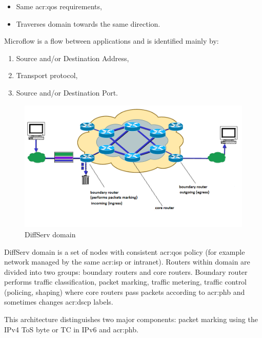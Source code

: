 \documentclass[11pt]{book}
\begin{document}
        \begin{itemize}
          \item Same \gls{acr:qos} requirements,
          \item Traverses domain towards the same direction.
        \end{itemize}

        Microflow is a flow between applications and is identified mainly by:

        \begin{enumerate}
          \item Source and/or Destination Address,
          \item Transport protocol,
          \item Source and/or Destination Port.
        \end{enumerate}

        \begin{figure}[H]
          \begin{center}
            \includegraphics[width=.7\textwidth]{img/qos/diffserv.png}
          \end{center}
          \caption{DiffServ domain}
        \end{figure} %

        DiffServ domain is a set of nodes with consistent \gls{acr:qos} policy (for example network managed by the same
        \gls{acr:isp} or intranet). Routers within domain are divided into two groups: boundary routers and core
        routers. Boundary router performs traffic classification, packet marking, traffic metering, traffic control
        (policing, shaping) where core routers pass packets according to \gls{acr:phb} and sometimes changes
        \gls{acr:dscp} labels.

        This architecture distinguishes two major components: packet marking using the IPv4 ToS byte or TC in IPv6 and
        \gls{acr:phb}.
\end{document}
